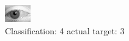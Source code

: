 \begin{figure}[h!]
\begin{center}
\includegraphics[width=0.60\columnwidth]{figures/ID2859_class_4_target_3.png}
\end{center}
\caption{ Classification: 4 actual target: 3}
\label{fig:ID2859_class_4_target_3}
\end{figure}
